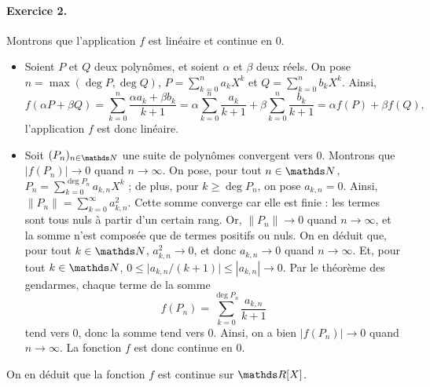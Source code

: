 \documentclass[a4paper]{article}
\begin{document}
	\paragraph{Exercice 2.}
	Montrons que l'application $f$ est linéaire et continue en 0.
	\begin{itemize}
		\item Soient $P$ et $Q$ deux polynômes, et soient $\alpha$ et $\beta$ deux réels.
			On pose $n = \max(\deg P, \deg Q)$, $P = \sum_{k=0}^n a_k X^k$ et $Q = \sum_{k=0}^n b_k X^k$.
			Ainsi,
			\[
				f(\alpha P + \beta Q) = \sum_{k=0}^n \frac{\alpha a_k + \beta b_k}{k + 1} = \alpha\sum_{k=0}^n \frac{a_k}{k+1} + \beta \sum_{k=0}^n \frac{b_k}{k+1} = \alpha f(P) + \beta f(Q),
			\]l'application $f$ est donc linéaire.
		\item Soit $(P_n)_{n\in\N}$ une suite de polynômes convergent vers $0$.
			Montrons que $|f(P_n)| \to 0$ quand $n \to \infty$.
			On pose, pour tout $n \in \N$, $P_n = \sum_{k=0}^{\deg P_n} a_{k,n} X^k$ ; de plus, pour $k \ge \deg P_n$, on pose $a_{k,n} = 0$.
			Ainsi, $\|P_n\| = \sum_{k=0}^\infty a_{k,n}^2$. Cette somme converge car elle est finie : les termes sont tous nuls à partir d'un certain rang.
			Or, $\|P_n\| \to 0$ quand $n\to \infty$, et la somme n'est composée que de termes positifs ou nuls. On en déduit que, pour tout $k \in \N$, $a_{k,n}^2 \to 0$, et donc $a_{k,n}\to 0$ quand $n\to \infty$.
			Et, pour tout $k \in \N$, $0 \le \big| a_{k,n} / (k + 1) \big| \le |a_{k,n}| \to 0$.
			Par le théorème des gendarmes, chaque terme de la somme \[
				f(P_n) = \sum_{k=0}^{\deg P_n} \frac{a_{k,n}}{k+1}
			\] tend vers 0, donc la somme tend vers 0.
			Ainsi, on a bien $|f(P_n)| \to 0$ quand $n\to \infty$.
			La fonction $f$ est donc continue en $0$.
	\end{itemize}
	On en déduit que la fonction $f$ est continue sur $\R[X]$.
\end{document}
